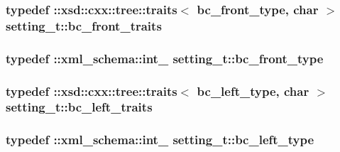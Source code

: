 \subsubsection[{\texorpdfstring{bc\+\_\+front\+\_\+traits}{bc_front_traits}}]{\setlength{\rightskip}{0pt plus 5cm}typedef \+::xsd\+::cxx\+::tree\+::traits$<$ {\bf bc\+\_\+front\+\_\+type}, char $>$ {\bf setting\+\_\+t\+::bc\+\_\+front\+\_\+traits}}\hypertarget{classsetting__t_a371a2bd08322094079d3ff5fbebf6add}{}\label{classsetting__t_a371a2bd08322094079d3ff5fbebf6add}
\subsubsection[{\texorpdfstring{bc\+\_\+front\+\_\+type}{bc_front_type}}]{\setlength{\rightskip}{0pt plus 5cm}typedef \+::{\bf xml\+\_\+schema\+::int\+\_\+} {\bf setting\+\_\+t\+::bc\+\_\+front\+\_\+type}}\hypertarget{classsetting__t_a6010c9a9fc3ce2a4d583aa4bf07f650c}{}\label{classsetting__t_a6010c9a9fc3ce2a4d583aa4bf07f650c}
\subsubsection[{\texorpdfstring{bc\+\_\+left\+\_\+traits}{bc_left_traits}}]{\setlength{\rightskip}{0pt plus 5cm}typedef \+::xsd\+::cxx\+::tree\+::traits$<$ {\bf bc\+\_\+left\+\_\+type}, char $>$ {\bf setting\+\_\+t\+::bc\+\_\+left\+\_\+traits}}\hypertarget{classsetting__t_a1618c9945b34bcf5522be0925ad0b6b7}{}\label{classsetting__t_a1618c9945b34bcf5522be0925ad0b6b7}
\subsubsection[{\texorpdfstring{bc\+\_\+left\+\_\+type}{bc_left_type}}]{\setlength{\rightskip}{0pt plus 5cm}typedef \+::{\bf xml\+\_\+schema\+::int\+\_\+} {\bf setting\+\_\+t\+::bc\+\_\+left\+\_\+type}}\hypertarget{classsetting__t_a182532ef9d6146add054e0118af040f2}{}\label{classsetting__t_a182532ef9d6146add054e0118af040f2}
